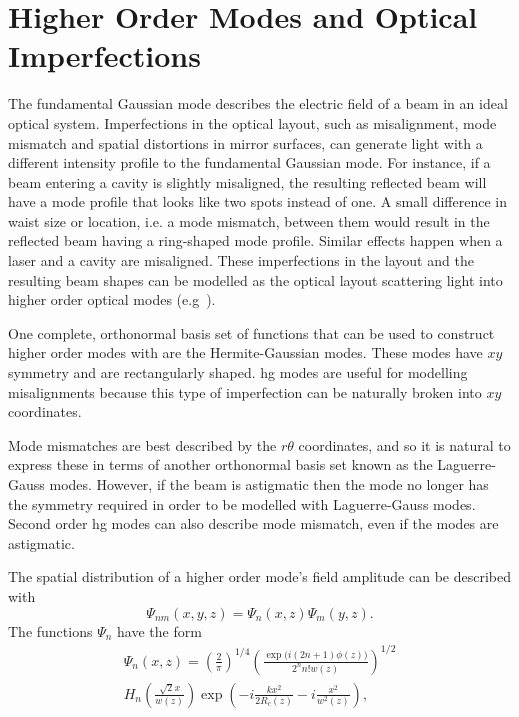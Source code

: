 \section{Higher Order Modes and Optical Imperfections}
The fundamental Gaussian mode describes the electric field of a beam in an ideal optical system. Imperfections in the optical layout, such as misalignment, mode mismatch and spatial distortions in mirror surfaces, can generate light with a different intensity profile to the fundamental Gaussian mode. For instance, if a beam entering a cavity is slightly misaligned, the resulting reflected beam will have a mode profile that looks like two spots instead of one. A small difference in waist size or location, i.e. a mode mismatch, between them would result in the reflected beam having a ring-shaped mode profile. Similar effects happen when a laser and a cavity are misaligned. These imperfections in the layout and the resulting beam shapes can be modelled as the optical layout scattering light into higher order optical modes (e.g~\cite{Morrison1994}). 
\par
One complete, orthonormal basis set of functions that can be used to construct higher order modes with are the Hermite-Gaussian modes. These modes have $xy$ symmetry and are rectangularly shaped. \gls{hg} modes are useful for modelling misalignments because this type of imperfection can be naturally broken into $xy$ coordinates.
\par
Mode mismatches are best described by the $r\theta$ coordinates, and so it is natural to express these in terms of another orthonormal basis set known as the Laguerre-Gauss modes. However, if the beam is astigmatic then the mode no longer has the symmetry required in order to be modelled with Laguerre-Gauss modes. Second order \gls{hg} modes can also describe mode mismatch, even if the modes are astigmatic.
\par
The spatial distribution of a higher order mode's field amplitude can be described with
\begin{equation}
\Psi_{nm}(x,y,z) = \Psi_n(x,z)\Psi_m(y,z).
\end{equation}
The functions $\Psi_{n}$ have the form
\begin{multline}
\Psi_n(x,z) = \left(\frac{2}{\pi}\right)^{1/4} \left(\frac{\exp\big(i(2n+1)\phi(z)\big)}{2^nn!w(z)}\right)^{1/2}\\ H_n\left(\frac{\sqrt{2}x}{w(z)}\right)\exp\left(-i\frac{kx^2}{2R_c(z)} - i\frac{x^2}{w^2(z)}\right),
\end{multline}
